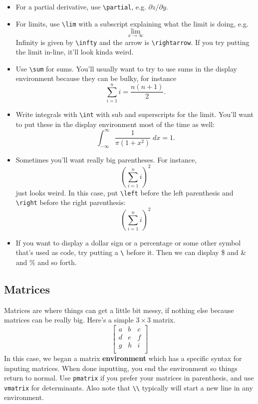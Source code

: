 \documentclass[12pt]{article}
\begin{document}
\begin{itemize}
		\item For a partial derivative, use \verb|\partial|, e.g. $\partial z/\partial y$. 
		
		\item For limits, use \verb|\lim| with a subscript explaining what the limit is 
		doing, e.g.
				\[ \lim_{x \rightarrow \infty}  \]
		Infinity is given by \verb|\infty| and  the arrow is \verb|\rightarrow|. If you 
		try putting the limit in-line, it'll look kinda weird. 
		
		\item Use \verb|\sum| for sums. You'll usually want to try to use sums in the 
		display environment because they can be bulky, for instance
			\[\sum_{i=1}^n i = \frac{n(n+1)}{2}.\]
			
		\item Write integrals with \verb|\int| with sub and superscripts for the limit. 
		You'll want to put these in the display environment most of the time as well:
			\[ \int_{-\infty}^{\infty} \frac{1}{\pi(1+x^2)} \; dx = 1 .\]
			
		\item Sometimes you'll want really big parentheses. For instance,
				\[ ( \sum_{i=1}^n i)^2	\]
			just looks weird. In this case, put \verb|\left| before the left parenthesis 
			and \verb|\right| before the right parenthesis:
				\[ \left( \sum_{i=1}^n i \right)^2	\]
				
		\item If you want to display a dollar sign or a percentage or some other symbol 
		that's used as code, try putting a \verb|\| before it. Then we can display \$ 
		and \& and \% and so forth.
	\end{itemize}
	
	
\subsection{Matrices}

Matrices are where things can get a little bit messy, if nothing else because matrices 
can be really big. Here's a simple $3 \times 3$ matrix. 
\[
	\begin{bmatrix}
		a	&	b	&	c	\\
		d	&	e	&	f	\\
		g	&	h	&	i	\\
	\end{bmatrix}
\]
In this case, we began a matrix \textbf{environment} which has a specific syntax for 
inputing matrices. When done inputting, you end the environment so things return to 
normal. Use \verb|pmatrix| if you prefer your matrices in parenthesis, and use 
\verb|vmatrix| for determinants. Also note that \verb|\\| typically will start a new 
line in any environment.
\end{document}

